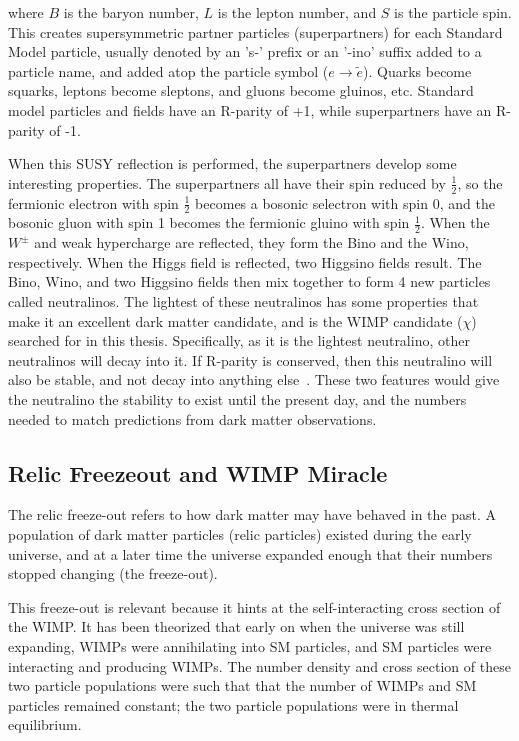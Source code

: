 where $B$ is the baryon number, $L$ is the lepton number, and $S$ is the particle spin.
This creates supersymmetric partner particles (superpartners) for each Standard Model particle, usually denoted by an 's-' prefix or an '-ino' suffix added to a particle name, and \nicetilde{} added atop the particle symbol ($e \rightarrow \tilde{e}$).
Quarks become squarks, leptons become sleptons, and gluons become gluinos, etc.
Standard model particles and fields have an R-parity of +1, while superpartners have an R-parity of -1.

When this SUSY reflection is performed, the superpartners develop some interesting properties.
The superpartners all have their spin reduced by $\frac{1}{2}$, so the fermionic electron with spin $\frac{1}{2}$ becomes a bosonic selectron with spin $0$, and the bosonic gluon with spin 1 becomes the fermionic gluino with spin $\frac{1}{2}$.
When the $W^{\pm}$  and weak hypercharge are reflected, they form the Bino and the Wino, respectively.
When the Higgs field is reflected, two Higgsino fields result.
The Bino, Wino, and two Higgsino fields then mix together to form 4 new particles called neutralinos.
The lightest of these neutralinos has some properties that make it an excellent dark matter candidate, and is the WIMP candidate ($\chi$) searched for in this thesis.
Specifically, as it is the lightest neutralino, other neutralinos will decay into it.
If R-parity is conserved, then this neutralino will also be stable, and not decay into anything else~\cite{neutralino1,neutralino2,neutralino3}.
These two features would give the neutralino the stability to exist until the present day, and the numbers needed to match predictions from dark matter observations.

\subsection{Relic Freezeout and WIMP Miracle}

The relic freeze-out refers to how dark matter may have behaved in the past.
A population of dark matter particles (relic particles) existed during the early universe, and at a later time the universe expanded enough that their numbers stopped changing (the freeze-out).

This freeze-out is relevant because it hints at the self-interacting cross section of the WIMP.
It has been theorized that early on when the universe was still expanding, WIMPs were annihilating into SM particles, and SM particles were interacting and producing WIMPs.
The number density and cross section of these two particle populations were such that that the number of WIMPs and SM particles remained constant; the two particle populations were in thermal equilibrium.

